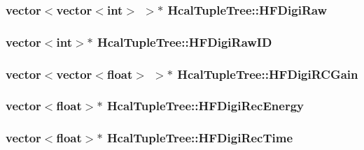 \subsubsection[{H\+F\+Digi\+Raw}]{\setlength{\rightskip}{0pt plus 5cm}vector$<$vector$<$int$>$ $>$$\ast$ Hcal\+Tuple\+Tree\+::\+H\+F\+Digi\+Raw}\label{class_hcal_tuple_tree_ae3043c51037d009294ec7567b8c9ce01}
\hypertarget{class_hcal_tuple_tree_a55519617ad78d9e9ec81e88aaa2f7e60}{}
\subsubsection[{H\+F\+Digi\+Raw\+I\+D}]{\setlength{\rightskip}{0pt plus 5cm}vector$<$int$>$$\ast$ Hcal\+Tuple\+Tree\+::\+H\+F\+Digi\+Raw\+I\+D}\label{class_hcal_tuple_tree_a55519617ad78d9e9ec81e88aaa2f7e60}
\hypertarget{class_hcal_tuple_tree_a9cc44ef6fd299d20874e0b07eb68b94c}{}
\subsubsection[{H\+F\+Digi\+R\+C\+Gain}]{\setlength{\rightskip}{0pt plus 5cm}vector$<$vector$<$float$>$ $>$$\ast$ Hcal\+Tuple\+Tree\+::\+H\+F\+Digi\+R\+C\+Gain}\label{class_hcal_tuple_tree_a9cc44ef6fd299d20874e0b07eb68b94c}
\hypertarget{class_hcal_tuple_tree_a3e26e7151e6cbba42bee136f6e46e07e}{}
\subsubsection[{H\+F\+Digi\+Rec\+Energy}]{\setlength{\rightskip}{0pt plus 5cm}vector$<$float$>$$\ast$ Hcal\+Tuple\+Tree\+::\+H\+F\+Digi\+Rec\+Energy}\label{class_hcal_tuple_tree_a3e26e7151e6cbba42bee136f6e46e07e}
\hypertarget{class_hcal_tuple_tree_af95d1984176d950add73dc9d411cda04}{}
\subsubsection[{H\+F\+Digi\+Rec\+Time}]{\setlength{\rightskip}{0pt plus 5cm}vector$<$float$>$$\ast$ Hcal\+Tuple\+Tree\+::\+H\+F\+Digi\+Rec\+Time}\label{class_hcal_tuple_tree_af95d1984176d950add73dc9d411cda04}
\hypertarget{class_hcal_tuple_tree_a49bb2b44d538e77e9d13793881c53d97}{}
